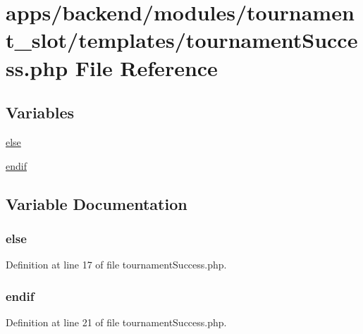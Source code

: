 \hypertarget{tournament_success_8php}{\section{apps/backend/modules/tournament\-\_\-slot/templates/tournament\-Success.php File Reference}
\label{tournament_success_8php}
}
\subsection*{Variables}
\begin{DoxyCompactItemize}
\item 
\hyperlink{tournament_success_8php_a0544c3fe466e421738dae463968b70ba}{else}
\item 
\hyperlink{tournament_success_8php_a82cd33ca97ff99f2fcc5e9c81d65251b}{endif}
\end{DoxyCompactItemize}


\subsection{Variable Documentation}
\hypertarget{tournament_success_8php_a0544c3fe466e421738dae463968b70ba}{
\subsubsection[{else}]{\setlength{\rightskip}{0pt plus 5cm}else}}\label{tournament_success_8php_a0544c3fe466e421738dae463968b70ba}


Definition at line 17 of file tournament\-Success.\-php.

\hypertarget{tournament_success_8php_a82cd33ca97ff99f2fcc5e9c81d65251b}{
\subsubsection[{endif}]{\setlength{\rightskip}{0pt plus 5cm}endif}}\label{tournament_success_8php_a82cd33ca97ff99f2fcc5e9c81d65251b}


Definition at line 21 of file tournament\-Success.\-php.

